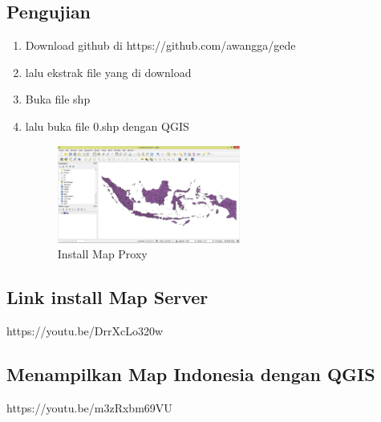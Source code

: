 \subsection{Pengujian}
\begin{enumerate}
	\item Download github di https://github.com/awangga/gede
	\item lalu ekstrak file yang di download
	\item Buka file shp
	\item lalu buka file 0.shp dengan QGIS
		\begin{figure}[H]
			\includegraphics[width=6cm]{figures/Tugas4/1174076/13.png}
			\centering
			\caption{Install Map Proxy}
		\end{figure}
\end{enumerate}


\subsection{Link install Map Server}
https://youtu.be/DrrXcLo320w
\subsection{Menampilkan Map Indonesia dengan QGIS}
https://youtu.be/m3zRxbm69VU
